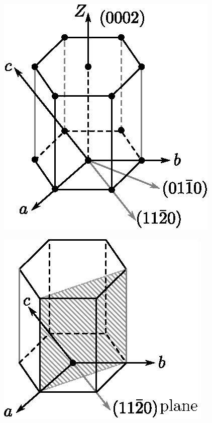 \chapter[Lecture 14]{}\label{lec14}

\begin{minipage}[c]{6.5cm}
\begin{figure}[H]
\centering
\includegraphics{images/lecture14/fig1.eps}
\end{figure}
\end{minipage}
\qquad
\begin{minipage}[c]{6.5cm}
\begin{figure}[H]
\centering
\includegraphics{images/lecture14/fig2.eps}
\end{figure}
\end{minipage}

